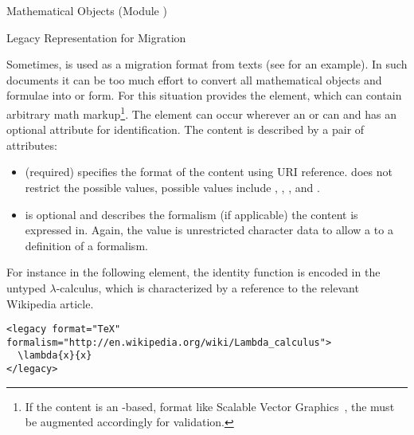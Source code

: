 \begin{tchapter}[id=mobj,short=Mathematical Objects]{Mathematical Objects (Module {})}
\begin{tsection}[id=legacy]{Legacy Representation for Migration}

  Sometimes, {\omdoc} is used as a migration format from {} texts (see
  {} for an example). In such documents it can be too much effort to
  convert all mathematical objects and formulae into {\openmath} or {\cmathml} form. For
  this situation {\omdoc} provides the {} element, which can contain
  arbitrary math markup\footnote{If the content is an {\xml}-based, format like Scalable
    Vector Graphics~\cite{W3C:svg02}, the {} must be augmented accordingly
    for validation.}. The {} element can occur wherever an
  {} or {} can and has an optional
  {} attribute for identification. The content is
  described by a pair of attributes:
\begin{itemize}
\item {} (required) specifies the format of the content
  using URI reference. {\omdoc} does not restrict the possible values, possible values
  include {}, {},
  {}, and {}.
\item {} is optional and describes the formalism (if
  applicable) the content is expressed in. Again, the value is unrestricted character data
  to allow a {} to a definition of a formalism.
\end{itemize}

For instance in the following {} element, the identity function is encoded
in the untyped $\lambda$-calculus, which is characterized by a reference to the relevant
Wikipedia article.

\begin{lstlisting}[index={legacy}]
<legacy format="TeX" formalism="http://en.wikipedia.org/wiki/Lambda_calculus">
  \lambda{x}{x}
</legacy>
\end{lstlisting}
\end{tsection}
\end{tchapter}

